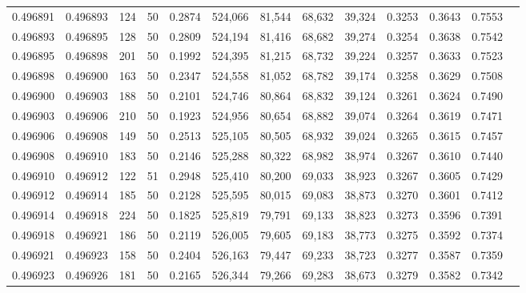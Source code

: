 \begin{tabular}{rrrrrrrrrrrrr}
0.496891 & 0.496893 &   124 &  50 &                                     0.2874 & 524,066 &  81,544 &  68,632 &  39,324 & 0.3253 & 0.3643 & 0.7553 \\
0.496893 & 0.496895 &   128 &  50 &                                     0.2809 & 524,194 &  81,416 &  68,682 &  39,274 & 0.3254 & 0.3638 & 0.7542 \\
0.496895 & 0.496898 &   201 &  50 &                                     0.1992 & 524,395 &  81,215 &  68,732 &  39,224 & 0.3257 & 0.3633 & 0.7523 \\
0.496898 & 0.496900 &   163 &  50 &                                     0.2347 & 524,558 &  81,052 &  68,782 &  39,174 & 0.3258 & 0.3629 & 0.7508 \\
0.496900 & 0.496903 &   188 &  50 &                                     0.2101 & 524,746 &  80,864 &  68,832 &  39,124 & 0.3261 & 0.3624 & 0.7490 \\
0.496903 & 0.496906 &   210 &  50 &                                     0.1923 & 524,956 &  80,654 &  68,882 &  39,074 & 0.3264 & 0.3619 & 0.7471 \\
0.496906 & 0.496908 &   149 &  50 &                                     0.2513 & 525,105 &  80,505 &  68,932 &  39,024 & 0.3265 & 0.3615 & 0.7457 \\
0.496908 & 0.496910 &   183 &  50 &                                     0.2146 & 525,288 &  80,322 &  68,982 &  38,974 & 0.3267 & 0.3610 & 0.7440 \\
0.496910 & 0.496912 &   122 &  51 &                                     0.2948 & 525,410 &  80,200 &  69,033 &  38,923 & 0.3267 & 0.3605 & 0.7429 \\
0.496912 & 0.496914 &   185 &  50 &                                     0.2128 & 525,595 &  80,015 &  69,083 &  38,873 & 0.3270 & 0.3601 & 0.7412 \\
0.496914 & 0.496918 &   224 &  50 &                                     0.1825 & 525,819 &  79,791 &  69,133 &  38,823 & 0.3273 & 0.3596 & 0.7391 \\
0.496918 & 0.496921 &   186 &  50 &                                     0.2119 & 526,005 &  79,605 &  69,183 &  38,773 & 0.3275 & 0.3592 & 0.7374 \\
0.496921 & 0.496923 &   158 &  50 &                                     0.2404 & 526,163 &  79,447 &  69,233 &  38,723 & 0.3277 & 0.3587 & 0.7359 \\
0.496923 & 0.496926 &   181 &  50 &                                     0.2165 & 526,344 &  79,266 &  69,283 &  38,673 & 0.3279 & 0.3582 & 0.7342 \\

\end{tabular}
